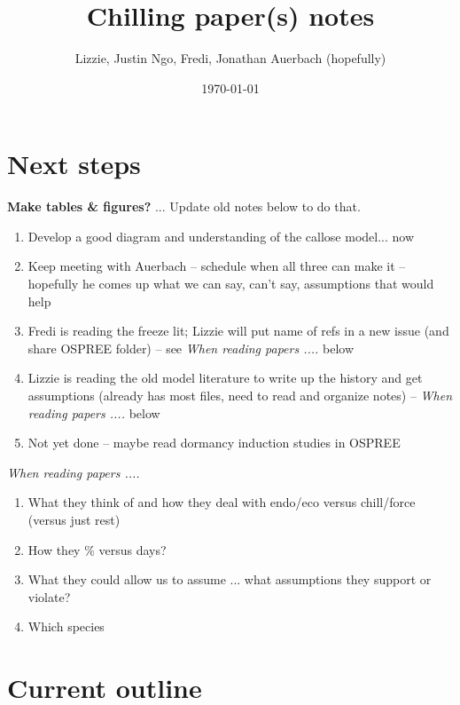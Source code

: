 \documentclass[11pt,letter]{article}
\begin{document}

\renewcommand{\refname}{\CHead{}}

\title{Chilling paper(s) notes}
\author{Lizzie, Justin Ngo, Fredi, Jonathan Auerbach (hopefully)} %
\date{\today}
\maketitle
\tableofcontents

\section{Next steps}

{\bf Make tables \& figures?} ... Update old notes below to do that. 

\begin{enumerate}
\item Develop a good diagram and understanding of the callose model... now
\item Keep meeting with Auerbach -- schedule when all three can make it -- hopefully he comes up what we can say, can't say, assumptions that would help
\item Fredi is reading the freeze lit; Lizzie will put name of refs in a new issue (and share OSPREE folder) -- see \emph{When reading papers .... } below
\item Lizzie is reading the old model literature to write up the history and get assumptions (already has most files, need to read and organize notes) -- \emph{When reading papers .... } below
\item Not yet done -- maybe read dormancy induction studies in OSPREE 
\end{enumerate}

\emph{When reading papers .... }
\begin{enumerate}
\item What they think of and how they deal with endo/eco versus chill/force (versus just rest)
\item How they \% versus days?
\item What they could allow us to assume ... what assumptions they support or violate?
\item Which species
\end{enumerate}


\section{Current outline} %
\end{document}
